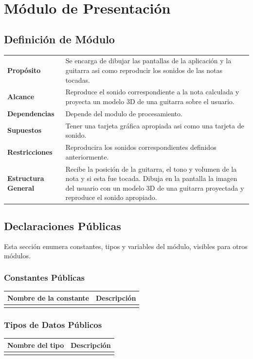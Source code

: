 \documentclass[a4paper,10pt]{article}
\begin{document}
\section{Módulo de Presentación}
\label{sec:presentacion}
\subsection{Definición de Módulo}
\begin{tabularx}{\textwidth}{p{25mm} X}
        \textbf{Propósito} & Se encarga de dibujar las pantallas de la aplicación y la guitarra asi como reproducir los sonidos de las notas tocadas.\\
        \textbf{Alcance} & Reproduce el sonido correspondiente a la nota calculada y proyecta un modelo 3D de una guitarra sobre el usuario.\\
        \textbf{Dependencias} & Depende del modulo de procesamiento.\\
        \textbf{Supuestos} & Tener una tarjeta gráfica apropiada asi como una tarjeta de sonido.\\
        \textbf{Restricciones} & Reproducira los sonidos correspondientes definidos anteriormente.\\
        \textbf{Estructura General} & Recibe la posición de la guitarra, el tono y volumen de la nota y si esta fue tocada. Dibuja en la pantalla la imagen del usuario con un modelo 3D de una guitarra proyectada y reproduce el sonido apropiado.\\
\end{tabularx}
\subsection{Declaraciones Públicas}
Esta sección enumera constantes, tipos y variables del módulo, visibles para
otros módulos.
\subsubsection{Constantes Públicas}
\begin{tabular}{| p{30mm} | p{10cm} |}
        \hline
        \textbf{Nombre de la \mbox{constante}} & \textbf{Descripción} \\
        \hline
         & \\
        \hline
\end{tabular}
                

\subsubsection{Tipos de Datos Públicos}
\begin{tabular}{| p{30mm} | p{10cm} |}
        \hline
        \textbf{Nombre del \mbox{tipo}} & \textbf{Descripción} \\
        \hline
         & \\
        \hline
\end{tabular}
\end{document}
